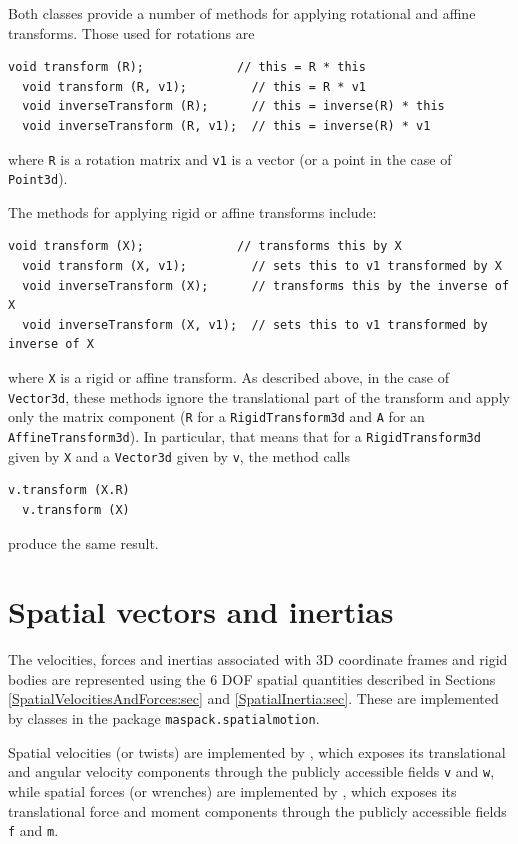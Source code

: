 Both classes provide a number of methods for applying rotational and
affine transforms. Those used for rotations are
\begin{lstlisting}[]
  void transform (R);             // this = R * this
  void transform (R, v1);         // this = R * v1
  void inverseTransform (R);      // this = inverse(R) * this
  void inverseTransform (R, v1);  // this = inverse(R) * v1
\end{lstlisting}
%
where {\tt R} is a rotation matrix and {\tt v1} is a vector (or a point
in the case of {\tt Point3d}).

The methods for applying rigid or affine transforms include:
\begin{lstlisting}[]
  void transform (X);             // transforms this by X         
  void transform (X, v1);         // sets this to v1 transformed by X
  void inverseTransform (X);      // transforms this by the inverse of X
  void inverseTransform (X, v1);  // sets this to v1 transformed by inverse of X
\end{lstlisting}
%
where {\tt X} is a rigid or affine transform.
As described above, in the case of {\tt Vector3d}, these methods
ignore the translational part of the transform and apply only the
matrix component ({\tt R} for a {\tt RigidTransform3d} and {\tt A} for
an {\tt AffineTransform3d}).
In particular, that means that for a {\tt RigidTransform3d} given by {\tt X}
and a {\tt Vector3d} given by {\tt v},
the method calls
%
\begin{lstlisting}[]
  v.transform (X.R)
  v.transform (X)
\end{lstlisting}
%
produce the same result.

\section{Spatial vectors and inertias}
\label{SpatialVectors:sec}

The velocities, forces and inertias associated with 3D coordinate
frames and rigid bodies are represented using the 6 DOF spatial
quantities described in Sections \ref{SpatialVelocitiesAndForces:sec}
and \ref{SpatialInertia:sec}. These are implemented by classes in the
package {\tt maspack.spatialmotion}.

Spatial velocities (or twists) are implemented by
, which exposes its
translational and angular velocity components through the publicly
accessible fields {\tt v} and {\tt w}, while spatial forces (or
wrenches) are implemented by
, which exposes its
translational force and moment components through the publicly
accessible fields {\tt f} and {\tt m}.

